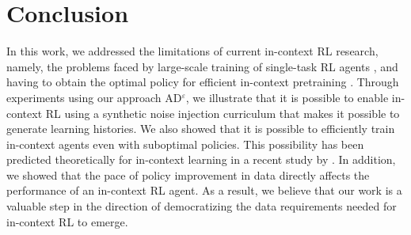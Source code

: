 \documentclass{article}
\theoremstyle{plain}
\theoremstyle{definition}
\theoremstyle{remark}
\begin{document}




\section{Conclusion}
In this work, we addressed the limitations of current in-context RL research, namely, the problems faced by large-scale training of single-task RL agents \cite{laskin2022context}, and having to obtain the optimal policy for efficient in-context pretraining \cite{lee2023supervised}. Through experiments using our approach AD$^\varepsilon$, we illustrate that it is possible to enable in-context RL using a synthetic noise injection curriculum that makes it possible to generate learning histories. We also showed that it is possible to efficiently train in-context agents even with suboptimal policies. This possibility has been predicted theoretically for in-context learning in a recent study by \citet{jeon2024informationtheoretic}. In addition, we showed that the pace of policy improvement in data directly affects the performance of an in-context RL agent. As a result, we believe that our work is a valuable step in the direction of democratizing the data requirements needed for in-context RL to emerge. 
\end{document}
